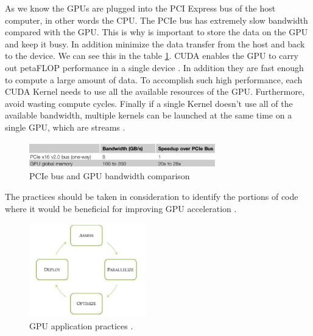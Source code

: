 As we know the GPUs are plugged into the PCI Express bus of the host computer, in other words the CPU. The PCIe bus has extremely slow bandwidth compared with the GPU. This is why is important to store the data on the GPU and keep it busy. In addition minimize the data transfer from the host and back to the device. We can see this in the table \ref{fig:PCI}. CUDA enables the GPU to carry out petaFLOP performance in a single device \cite{cook}. In addition they are fast enough to compute a large amount of data. To accomplish such high performance, each CUDA Kernel needs to use all the available resources of the GPU. Furthermore, avoid wasting compute cycles. Finally if a single Kernel doesn't use all of the available bandwidth, multiple kernels can be launched at the same time on a single GPU, which are streams \cite{design}.

\begin{figure}[htbp]
	\centering
		\includegraphics[width=0.72\textwidth]{Figures/PCI.png}
		\smallskip
	\caption[PCIe Bandwidth]{PCIe bus and GPU bandwidth comparison \cite{cook}}
	\label{fig:PCI}
\end{figure}

The practices should be taken in consideration to identify the portions of code where it would be beneficial for improving GPU acceleration \cite{practices}.

\begin{figure}[htbp]
	\centering
		\includegraphics[width=0.45\textwidth]{Figures/apod.png}
		\smallskip
	\caption[GPU application practices]{GPU application practices \cite{practices}.}
	\label{fig:apod}
\end{figure}

